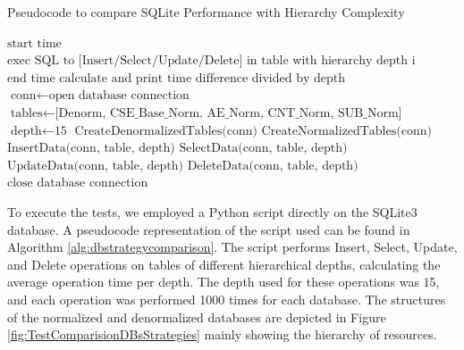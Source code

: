 \documentclass[a4paper,fleqn]{cas-dc}
\begin{document}
\begin{algorithm}
\scriptsize
\caption{Pseudocode to compare SQLite Performance with Hierarchy Complexity}
\label{alg:dbstrategycomparison}
\begin{algorithmic}[1]
    \State $\text{start time}$
        \State $\text{exec SQL to [Insert/Select/Update/Delete] in table with hierarchy depth i}$
    \EndFor
    \State $\text{end time}$
    \State $\text{calculate and print time difference divided by depth}$
\EndProcedure
\\
    \State $\text{conn} \gets \text{open database connection}$
    \State $\text{tables} \gets \text{[Denorm, CSE\_Base\_Norm, AE\_Norm, CNT\_Norm, SUB\_Norm]}$
    \State $\text{depth} \gets \text{15}$
    \State $\text{CreateDenormalizedTables(conn)}$
    \State $\text{CreateNormalizedTables(conn)}$
        \State $\text{InsertData(conn, table, depth)}$
        \State $\text{SelectData(conn, table, depth)}$
        \State $\text{UpdateData(conn, table, depth)}$
        \State $\text{DeleteData(conn, table, depth)}$
    \EndFor
    \State $\text{close database connection}$
\EndProcedure
\end{algorithmic}
\end{algorithm}

To execute the tests, we employed a Python script directly on the SQLite3 database. A pseudocode representation of the script used can be found in Algorithm \ref{alg:dbstrategycomparison}. The script performs Insert, Select, Update, and Delete operations on tables of different hierarchical depths, calculating the average operation time per depth. The depth used for these operations was 15, and each operation was performed 1000 times for each database. The structures of the normalized and denormalized databases are depicted in Figure \ref{fig:TestComparisionDBsStrategies} mainly showing the hierarchy of resources.
\end{document}
